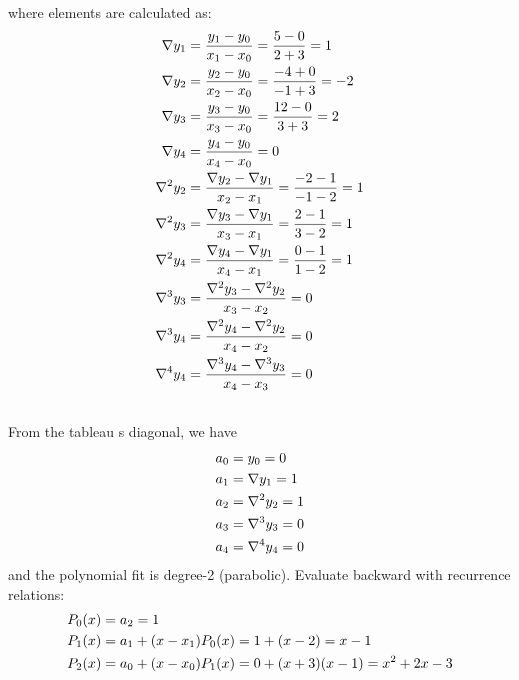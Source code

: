 \documentclass[12pt]{article}
\begin{document}
where elements are calculated as:\\
\begin{align}
\notag
\nabla y_1 &= \frac{y_1-y_0}{x_1-x_0}=\frac{5-0}{2+3}=1\\
\notag
\nabla y_2 &= \frac{y_2-y_0}{x_2-x_0}=\frac{-4+0}{-1+3}=-2\\
\notag
\nabla y_3 &= \frac{y_3-y_0}{x_3-x_0}=\frac{12-0}{3+3}=2\\
\notag
\nabla y_4 &= \frac{y_4-y_0}{x_4-x_0}=0\\
\notag
\nabla ^2 y_2 &= \frac{\nabla y_2-\nabla y_1}{x_2-x_1}=\frac{-2-1}{-1-2}=1\\
\notag
\nabla ^2 y_3 &= \frac{\nabla y_3-\nabla y_1}{x_3-x_1}=\frac{2-1}{3-2}=1\\
\notag
\nabla ^2 y_4 &= \frac{\nabla y_4-\nabla y_1}{x_4-x_1}=\frac{0-1}{1-2}=1\\
\notag
\nabla ^3 y_3 &= \frac{\nabla ^2 y_3-\nabla ^2 y_2}{x_3-x_2}=0\\
\notag
\nabla ^3 y_4 &= \frac{\nabla ^2 y_4-\nabla ^2 y_2}{x_4-x_2}=0\\
\notag
\nabla ^4 y_4 &= \frac{\nabla ^3 y_4-\nabla ^3 y_3}{x_4-x_3}=0\\
\notag
\end{align}
From the tableau \textquotesingle s diagonal, we have\\
\begin{align}
\notag
a_0&=y_0=0\\
\notag
a_1&=\nabla y_1=1\\
\notag
a_2&=\nabla ^2 y_2=1 \\
\notag
a_3&=\nabla ^3 y_3=0 \\
\notag
a_4&=\nabla ^4 y_4=0 \\
\end{align}
and the polynomial fit is degree-2 (parabolic).
Evaluate backward with recurrence relations:
\begin{align}
\notag
P_0(x) &= a_2 = 1\\
\notag
P_1(x) &= a_1 + (x-x_1)P_0(x) = 1 + (x-2) = x-1\\
\notag
P_2(x) &= a_0 + (x-x_0)P_1(x) = 0 + (x+3)(x-1) = x^2+2x-3\\
\notag
\end{align}
\end{document}
